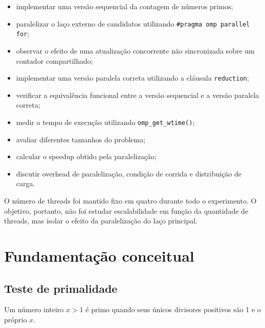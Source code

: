 \begin{itemize}
    \item implementar uma versão sequencial da contagem de números primos;
    
    \item paralelizar o laço externo de candidatos utilizando
    \texttt{\#pragma omp parallel for};
    
    \item observar o efeito de uma atualização concorrente não sincronizada
    sobre um contador compartilhado;
    
    \item implementar uma versão paralela correta utilizando a cláusula
    \texttt{reduction};
    
    \item verificar a equivalência funcional entre a versão sequencial e a
    versão paralela correta;
    
    \item medir o tempo de execução utilizando \texttt{omp\_get\_wtime()};
    
    \item avaliar diferentes tamanhos do problema;
    
    \item calcular o speedup obtido pela paralelização;
    
    \item discutir overhead de paralelização, condição de corrida e
    distribuição de carga.
\end{itemize}

O número de threads foi mantido fixo em quatro durante todo o experimento.
O objetivo, portanto, não foi estudar escalabilidade em função da quantidade
de threads, mas isolar o efeito da paralelização do laço principal.


\section{Fundamentação conceitual}
\label{sec:atvd05-fundamentacao}

\subsection{Teste de primalidade}

Um número inteiro \(x > 1\) é primo quando seus únicos divisores positivos
são 1 e o próprio \(x\).

